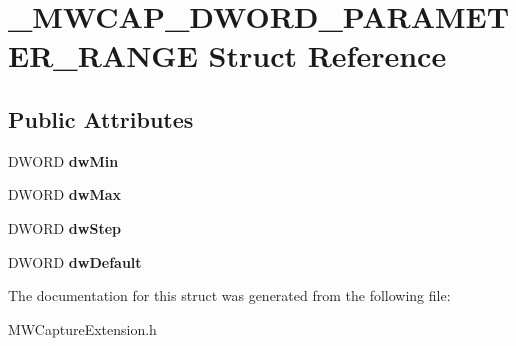 \hypertarget{struct__MWCAP__DWORD__PARAMETER__RANGE}{\section{\-\_\-\-M\-W\-C\-A\-P\-\_\-\-D\-W\-O\-R\-D\-\_\-\-P\-A\-R\-A\-M\-E\-T\-E\-R\-\_\-\-R\-A\-N\-G\-E Struct Reference}
\label{struct__MWCAP__DWORD__PARAMETER__RANGE}
}
\subsection*{Public Attributes}
\begin{DoxyCompactItemize}
\item 
\hypertarget{struct__MWCAP__DWORD__PARAMETER__RANGE_aa08fe489eeca63cf6642b2db7adb678f}{D\-W\-O\-R\-D {\bfseries dw\-Min}}\label{struct__MWCAP__DWORD__PARAMETER__RANGE_aa08fe489eeca63cf6642b2db7adb678f}

\item 
\hypertarget{struct__MWCAP__DWORD__PARAMETER__RANGE_af9311d9f09957b257b7aeab48a6743f5}{D\-W\-O\-R\-D {\bfseries dw\-Max}}\label{struct__MWCAP__DWORD__PARAMETER__RANGE_af9311d9f09957b257b7aeab48a6743f5}

\item 
\hypertarget{struct__MWCAP__DWORD__PARAMETER__RANGE_ad5c631e4a6b142bb4f1092ab75520495}{D\-W\-O\-R\-D {\bfseries dw\-Step}}\label{struct__MWCAP__DWORD__PARAMETER__RANGE_ad5c631e4a6b142bb4f1092ab75520495}

\item 
\hypertarget{struct__MWCAP__DWORD__PARAMETER__RANGE_a3352426ada5b271e5d2ad6dc2924e577}{D\-W\-O\-R\-D {\bfseries dw\-Default}}\label{struct__MWCAP__DWORD__PARAMETER__RANGE_a3352426ada5b271e5d2ad6dc2924e577}

\end{DoxyCompactItemize}


The documentation for this struct was generated from the following file\-:\begin{DoxyCompactItemize}
\item 
M\-W\-Capture\-Extension.\-h\end{DoxyCompactItemize}
